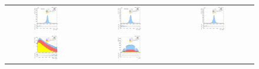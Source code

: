 \begin{figure}[ht]
  \begin{center}
    \begin{tabular}{ccc}
      \includegraphics[width=0.32\textwidth]{figures/Zprime/2016/complementary/h_mee_Zpeak_BB.png}&
      \includegraphics[width=0.32\textwidth]{figures/Zprime/2016/complementary/h_mee_Zpeak_BE.png}&
      \includegraphics[width=0.32\textwidth]{figures/Zprime/2016/complementary/h_mee_Zpeak.png}\\
      \includegraphics[width=0.32\textwidth]{figures/Zprime/2016/complementary/h_led_Et.png}&
      \includegraphics[width=0.32\textwidth]{figures/Zprime/2016/complementary/h_led_eta.png}&

\end{tabular}
\end{center}
\end{figure}
